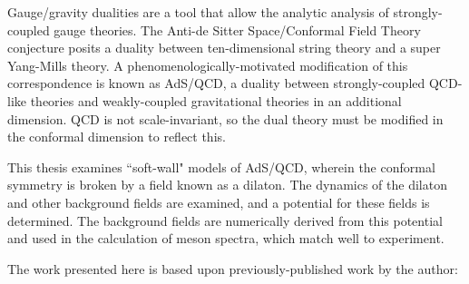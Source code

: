 

Gauge/gravity dualities are a tool that allow the analytic analysis of strongly-coupled gauge theories.
The Anti-de Sitter Space/Conformal Field Theory conjecture posits a duality between ten-dimensional string theory and a super Yang-Mills theory.
A phenomenologically-motivated modification of this correspondence is known as AdS/QCD, a duality between strongly-coupled QCD-like theories and weakly-coupled gravitational theories in an additional dimension.
QCD is not scale-invariant, so the dual theory must be modified in the conformal dimension to reflect this. 

This thesis examines ``soft-wall" models of AdS/QCD, wherein the conformal symmetry is broken by a field known as a dilaton.
The dynamics of the dilaton and other background fields are examined, and a potential for these fields is determined.
The background fields are numerically derived from this potential and used in the calculation of meson spectra, which match well to experiment.

The work presented here is based upon previously-published work by the author: